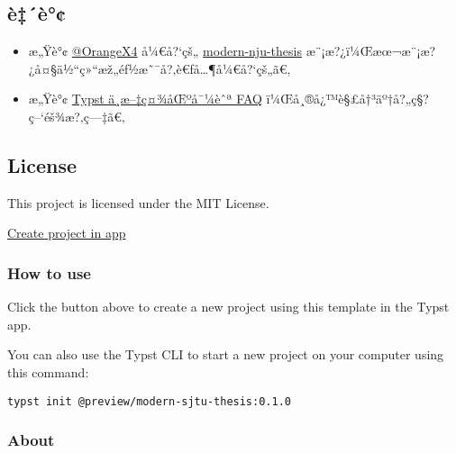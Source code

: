 \subsection{è‡´è°¢}\label{uxe8uxe8}

\begin{itemize}
\item
  æ„Ÿè°¢ \href{https://github.com/OrangeX4}{@OrangeX4} å¼€å?{}`çš„
  \href{https://github.com/nju-lug/modern-nju-thesis}{modern-nju-thesis}
  æ¨¡æ?¿ï¼Œæœ¬æ¨¡æ?¿å¤§ä½``ç»``æž„éƒ½æ˜¯å?‚è€ƒå\ldots¶å¼€å?{}`çš„ã€‚
\item
  æ„Ÿè°¢ \href{https://typst-doc-cn.github.io/guide/FAQ.html}{Typst
  ä¸­æ--‡ç¤¾åŒºå¯¼èˆª FAQ} ï¼Œå¸®å¿™è§£å†³äº†å?„ç§?ç--`éš¾æ?‚ç---‡ã€‚
\end{itemize}

\subsection{License}\label{license}

This project is licensed under the MIT License.

\href{/app?template=modern-sjtu-thesis&version=0.1.0}{Create project in
app}

\subsubsection{How to use}\label{how-to-use}

Click the button above to create a new project using this template in
the Typst app.

You can also use the Typst CLI to start a new project on your computer
using this command:

\begin{verbatim}
typst init @preview/modern-sjtu-thesis:0.1.0
\end{verbatim}



\subsubsection{About}\label{about}

